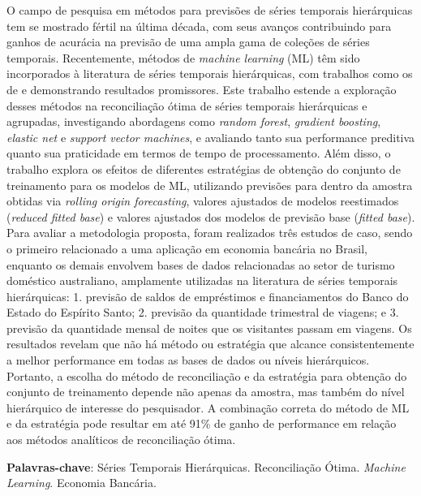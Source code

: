 

\setlength{\absparsep}{18pt}
\begin{resumo}
  O campo de pesquisa em métodos para previsões de séries temporais hierárquicas tem se mostrado fértil na última década, com seus avanços contribuindo para ganhos de acurácia na previsão de uma ampla gama de coleções de séries temporais. Recentemente, métodos de \textit{machine learning} (ML) têm sido incorporados à literatura de séries temporais hierárquicas, com trabalhos como os de \textcite{spiliotis_hierarchical_2021} e \textcite{makridakis_m5_2022} demonstrando resultados promissores. Este trabalho estende a exploração desses métodos na reconciliação ótima de séries temporais hierárquicas e agrupadas, investigando abordagens como \textit{random forest}, \textit{gradient boosting}, \textit{elastic net} e \textit{support vector machines}, e avaliando tanto sua performance preditiva quanto sua praticidade em termos de tempo de processamento. Além disso, o trabalho explora os efeitos de diferentes estratégias de obtenção do conjunto de treinamento para os modelos de ML, utilizando previsões para dentro da amostra obtidas via \textit{rolling origin forecasting}, valores ajustados de modelos reestimados (\textit{reduced fitted base}) e valores ajustados dos modelos de previsão base (\textit{fitted base}). Para avaliar a metodologia proposta, foram realizados três estudos de caso, sendo o primeiro relacionado a uma aplicação em economia bancária no Brasil, enquanto os demais envolvem bases de dados relacionadas ao setor de turismo doméstico australiano, amplamente utilizadas na literatura de séries temporais hierárquicas: 1. previsão de saldos de empréstimos e financiamentos do Banco do Estado do Espírito Santo; 2. previsão da quantidade trimestral de viagens; e 3. previsão da quantidade mensal de noites que os visitantes passam em viagens. Os resultados revelam que não há método ou estratégia que alcance consistentemente a melhor performance em todas as bases de dados ou níveis hierárquicos. Portanto, a escolha do método de reconciliação e da estratégia para obtenção do conjunto de treinamento depende não apenas da amostra, mas também do nível hierárquico de interesse do pesquisador. A combinação correta do método de ML e da estratégia pode resultar em até 91\% de ganho de performance em relação aos métodos analíticos de reconciliação ótima.

  \textbf{Palavras-chave}: Séries Temporais Hierárquicas. Reconciliação Ótima. \textit{Machine Learning}. Economia Bancária.
\end{resumo}

